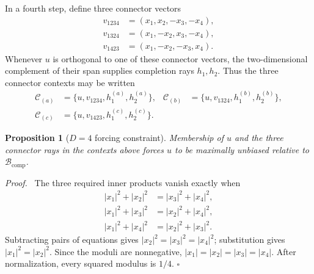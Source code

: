 \documentclass[%
  reprint,
  superscriptaddress,
  showpacs,
  showkeys,
  amsmath,amssymb,
  pra,
  longbibliography,
  floatfix,
  x11names
]{revtex4-2}
\newenvironment{revision}{\begingroup}{\endgroup}
\newtheorem{proposition}{Proposition}
\newenvironment{proof}{\par\noindent\textit{Proof.}\ }{\hfill$\square$\par}
\begin{document}
In a fourth step, define three connector vectors
\begin{align*}
v_{1234}&=(x_1,x_2,-x_3,-x_4),\\
v_{1324}&=(x_1,-x_2,x_3,-x_4),\\
v_{1423}&=(x_1,-x_2,-x_3,x_4).
\end{align*}
\begin{revision}
Whenever $u$ is orthogonal to one of these connector vectors, the two-dimensional complement of their span supplies completion rays $h_1,h_2$.  Thus the three connector contexts may be written
\begin{align*}
\mathcal{C}_{(a)}&=\{u,v_{1234},h^{(a)}_1,h^{(a)}_2\},&
\mathcal{C}_{(b)}&=\{u,v_{1324},h^{(b)}_1,h^{(b)}_2\},\\
\mathcal{C}_{(c)}&=\{u,v_{1423},h^{(c)}_1,h^{(c)}_2\}.
\end{align*}

\begin{proposition}[$D=4$ forcing constraint]
\label{prop:D4forcing}
Membership of $u$ and the three connector rays in the contexts above forces $u$ to be maximally unbiased relative to $\mathcal{B}_{\mathrm{comp}}$.
\end{proposition}

\begin{proof}
The three required inner products vanish exactly when
\begin{align}
|x_1|^2+|x_2|^2&=|x_3|^2+|x_4|^2, \label{eq:D4a}\\
|x_1|^2+|x_3|^2&=|x_2|^2+|x_4|^2, \label{eq:D4b}\\
|x_1|^2+|x_4|^2&=|x_2|^2+|x_3|^2. \label{eq:D4c}
\end{align}
Subtracting pairs of equations gives $|x_2|^2=|x_3|^2=|x_4|^2$; substitution gives $|x_1|^2=|x_2|^2$.  Since the moduli are nonnegative, \ensuremath{|x_1|=|x_2|=|x_3|=|x_4|}.  After normalization, every squared modulus is $1/4$.
\end{proof}


\end{revision}
\end{document}
